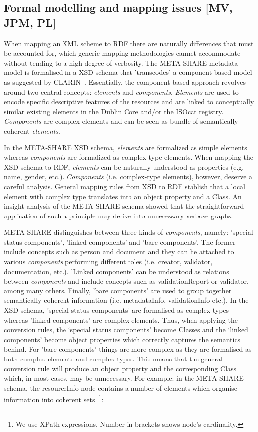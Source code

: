 \documentclass{llncs}
\begin{document}
\subsection{Formal modelling and mapping issues [MV, JPM, PL]}

When mapping an XML scheme to RDF there are naturally differences that must be
accounted for, which generic mapping methodologies cannot accommodate without
tending to a high degree of verbosity. The META-SHARE metadata model is formalised in a XSD schema that 'transcodes' a component-based model as suggested by CLARIN~\cite{broeder2012cmdi}. Essentially, the component-based approach revolves around two central concepts: \emph{elements} and \emph{components}. \emph{Elements} are used to encode specific descriptive features of the resources and are linked to conceptually similar existing elements in the Dublin Core and/or the ISOcat registry. \emph{Components} are complex elements and can be seen as bundle of semantically coherent \emph{elements}.

In the META-SHARE XSD schema, \emph{elements} are formalized as simple elements whereas \emph{components} are formalized as complex-type elements. When mapping the XSD schema to RDF, \emph{elements} can be naturally understood as properties (e.g. name, gender, etc.). \emph{Components} (i.e. complex-type elements), however,  deserve a careful analysis. General mapping rules from XSD to RDF stablish that a local element with complex type translates into an object property and a Class. An insight analysis of the META-SHARE schema showed that the straightforward application of such a principle may derive into unnecessary verbose graphs. 

META-SHARE distinguishes between three kinds of \emph{components}, namely: 'special status components', 'linked components' and 'bare components'. The former include concepts such as person and document and they can be attached to various \emph{components} performing different roles (i.e. creator, validator, documentation, etc.). 'Linked components' can be understood as relations between \emph{components} and include concepts such as validationReport or validator, among many others. Finally, 'bare components' are used to group together semantically coherent information (i.e. metadataInfo, validationInfo etc.). In the XSD schema, 'special status components' are formalised as complex types whereas 'linked components' are complex elements. Thus, when applying the conversion rules, the ‘special status components’ become Classes and the ‘linked components’ become object properties which correctly captures the semantics behind. For 'bare components' things are more complex as they are formalised as both complex elements and complex types. This means that the general conversion rule will produce an object property and the corresponding Class which, in most cases, may be unnecessary. For example: in the META-SHARE schema, the resourceInfo node contains a number of elements which organise information into coherent sets~\footnote{We use XPath expressions. Number in brackets shows node’s cardinality.}: 
\end{document}
